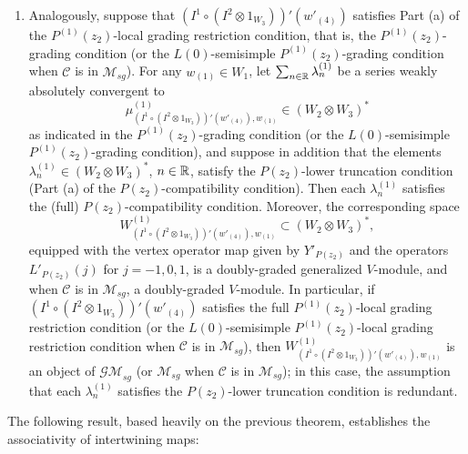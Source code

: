 \documentclass[12pt]{article}
\begin{document}
\begin{theo}
\begin{enumerate}
\item
Analogously, suppose that $(I^1\circ (I^2\otimes 1_{W_3}))'(w'_{(4)})$
satisfies Part (a) of the $P^{(1)}(z_2)$-local grading restriction
condition, that is, the $P^{(1)}(z_2)$-grading condition (or the
$L(0)$-semisimple $P^{(1)}(z_2)$-grading condition when $\mathcal{C}$
is in $\mathcal{M}_{sg}$).  For any $w_{(1)}\in W_{1}$, let
$\sum_{n\in \mathbb{R}}\lambda_{n}^{(1)}$ be a series weakly absolutely
convergent to
\[
\mu^{(1)}_{(I^1\circ (I^2\otimes 1_{W_3}))'(w'_{(4)}), w_{(1)}} \in
(W_2 \otimes W_3)^*
\]
as indicated in the $P^{(1)}(z_2)$-grading condition (or the
$L(0)$-semisimple $P^{(1)}(z_2)$-grading condition), and suppose in
addition that the elements $\lambda_{n}^{(1)} \in (W_{2}\otimes
W_{3})^{*}$, $n\in \mathbb{R}$, satisfy the $P(z_{2})$-lower truncation
condition (Part (a) of the $P(z_{2})$-compatibility condition).  Then
each $\lambda_{n}^{(1)}$ satisfies the (full) $P(z_{2})$-compatibility
condition.  Moreover, the corresponding space
\[
W^{(1)}_{(I^1\circ (I^2\otimes 1_{W_3}))'(w'_{(4)}), w_{(1)}} \subset
(W_{2}\otimes W_{3})^{*},
\]
equipped with the vertex operator map given by $Y'_{P(z_{2})}$ and the
operators $L'_{P(z_{2})}(j)$ for $j=-1, 0, 1$, is a doubly-graded
generalized $V$-module, and when $\mathcal{C}$ is in
$\mathcal{M}_{sg}$, a doubly-graded $V$-module.  In particular, if
$(I^1\circ (I^2\otimes 1_{W_3}))'(w'_{(4)})$ satisfies the full
$P^{(1)}(z_2)$-local grading restriction condition (or the
$L(0)$-semisimple $P^{(1)}(z_2)$-local grading restriction condition
when $\mathcal{C}$ is in $\mathcal{M}_{sg}$), then $W^{(1)}_{(I^1\circ
(I^2\otimes 1_{W_3}))'(w'_{(4)}), w_{(1)}}$ is an object of
$\mathcal{GM}_{sg}$ (or $\mathcal{M}_{sg}$ when $\mathcal{C}$ is in
$\mathcal{M}_{sg}$); in this case, the assumption that each
$\lambda_{n}^{(1)}$ satisfies the $P(z_2)$-lower truncation condition
is redundant.
\end{enumerate}
\end{theo}

The following result, based heavily on the previous theorem,
establishes the associativity of intertwining maps:
\end{document}
